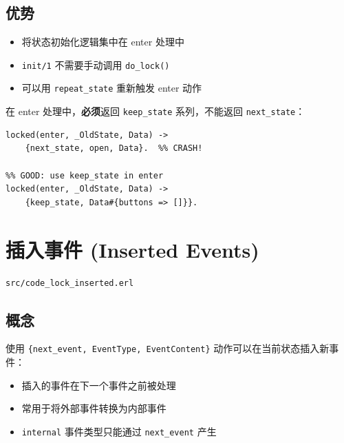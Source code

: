 \documentclass[a4paper,11pt]{article}
\begin{document}
\subsection{优势}

\begin{itemize}[leftmargin=2em]
    \item 将状态初始化逻辑集中在 enter 处理中
    \item \texttt{init/1} 不需要手动调用 \texttt{do\_lock()}
    \item 可以用 \texttt{repeat\_state} 重新触发 enter 动作
\end{itemize}

\begin{warnbox}[注意]
在 enter 处理中，\textbf{必须}返回 \texttt{keep\_state} 系列，不能返回 \texttt{next\_state}：
\begin{lstlisting}[style=erlangstyle]
%% BAD: state enter must not change state
locked(enter, _OldState, Data) ->
    {next_state, open, Data}.  %% CRASH!

%% GOOD: use keep_state in enter
locked(enter, _OldState, Data) ->
    {keep_state, Data#{buttons => []}}.
\end{lstlisting}
\end{warnbox}


\section{插入事件 (Inserted Events)}

\begin{notebox}[源码文件]
\texttt{src/code\_lock\_inserted.erl}
\end{notebox}

\subsection{概念}

使用 \texttt{\{next\_event, EventType, EventContent\}} 动作可以在当前状态插入新事件：

\begin{itemize}[leftmargin=2em]
    \item 插入的事件在下一个事件之前被处理
    \item 常用于将外部事件转换为内部事件
    \item \texttt{internal} 事件类型只能通过 \texttt{next\_event} 产生
\end{itemize}
\end{document}
